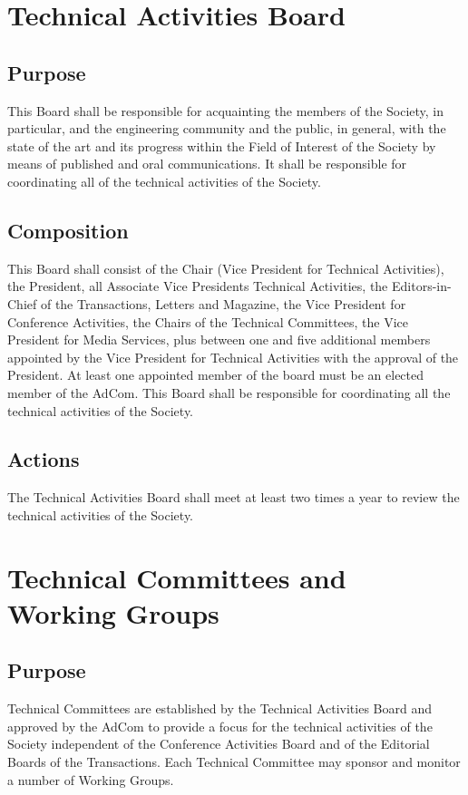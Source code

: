\documentclass[10pt]{article}
\begin{document}
\section{Technical Activities Board}
\label{TAB}

\subsection{Purpose}

This Board shall be responsible for acquainting the members of the Society, in particular, and the engineering community and the public, in general, with the state of the art and its progress within the Field of Interest of the Society by means of published and oral communications. It shall be responsible for coordinating all of the technical activities of the Society.


\subsection{Composition}

This Board shall consist of the Chair (Vice President for Technical Activities), the President, all Associate Vice Presidents Technical Activities, the Editors-in-Chief of the Transactions, Letters and Magazine, the Vice President for Conference Activities, the Chairs of the Technical Committees, the Vice President for Media Services, plus between one and five additional members appointed by the Vice President for Technical Activities with the approval of the President. At least one appointed member of the board must be an elected member of the AdCom. This Board shall be responsible for coordinating all the technical activities of the Society.


\subsection{Actions}

The Technical Activities Board shall meet at least two times a year to review the technical activities of the Society. 


\section{Technical Committees and Working Groups}
\label{TCs}



\subsection{Purpose}
Technical Committees are established by the Technical Activities Board and approved by the AdCom to provide a focus for the technical activities of the Society independent of the Conference Activities Board and of the Editorial Boards of the Transactions. Each Technical Committee may sponsor and monitor a number of Working Groups.
\end{document}
